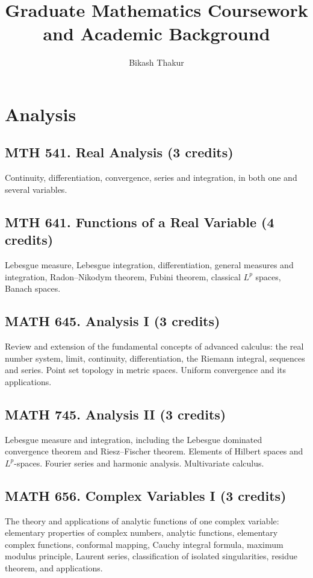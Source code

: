 \documentclass[11pt]{article}
\title{\textbf{Graduate Mathematics Coursework and Academic Background}}
\author{Bikash Thakur}
\date{}
\begin{document}
\maketitle

\section{Analysis}

\subsection{MTH 541. Real Analysis \mdseries(3 credits)}
Continuity, differentiation, convergence, series and integration, in both one and several variables.

\subsection{MTH 641. Functions of a Real Variable \mdseries(4 credits)}
Lebesgue measure, Lebesgue integration, differentiation, general measures and integration, Radon--Nikodym theorem, Fubini theorem, classical $L^p$ spaces, Banach spaces.

\subsection{MATH 645. Analysis I \mdseries(3 credits)}
Review and extension of the fundamental concepts of advanced calculus: the real number system, limit, continuity, differentiation, the Riemann integral, sequences and series. Point set topology in metric spaces. Uniform convergence and its applications.

\subsection{MATH 745. Analysis II \mdseries(3 credits)}
Lebesgue measure and integration, including the Lebesgue dominated convergence theorem and Riesz--Fischer theorem. Elements of Hilbert spaces and $L^p$-spaces. Fourier series and harmonic analysis. Multivariate calculus.

\subsection{MATH 656. Complex Variables I \mdseries(3 credits)}
The theory and applications of analytic functions of one complex variable: elementary properties of complex numbers, analytic functions, elementary complex functions, conformal mapping, Cauchy integral formula, maximum modulus principle, Laurent series, classification of isolated singularities, residue theorem, and applications.
\end{document}
